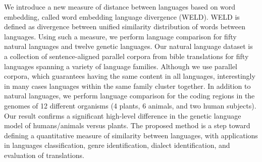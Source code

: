 We introduce a new measure of distance between languages based on word embedding, called word embedding language divergence (WELD). WELD is defined as divergence between unified similarity distribution of words between languages. Using such a measure, we perform language comparison for fifty natural languages and twelve genetic languages. Our natural language dataset is a collection of sentence-aligned parallel corpora from bible translations for fifty languages spanning a variety of language families. Although we use parallel corpora, which guarantees having the same content in all languages, interestingly in many cases languages within the same family cluster together. In addition to natural languages, we perform language comparison for the coding regions in the genomes of 12 different organisms (4 plants, 6 animals, and two human subjects). Our result confirms a significant high-level difference in the genetic language model of humans/animals versus plants. The proposed method is a step toward defining a quantitative measure of similarity between languages, with applications in languages classification, genre identification, dialect identification, and evaluation of translations.
